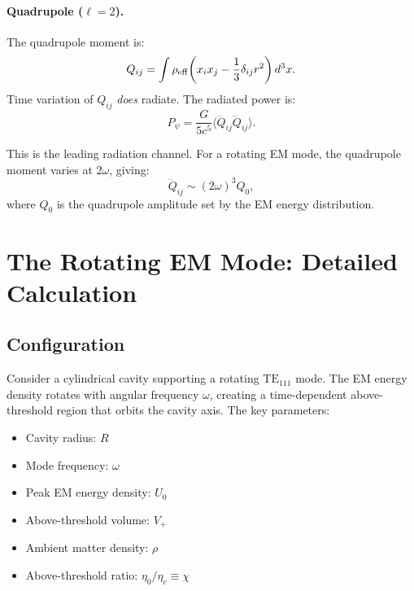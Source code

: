 \documentclass[11pt]{article}
\newcommand{\etac}{\eta_c}
\begin{document}
\paragraph{Quadrupole ($\ell = 2$).}
The quadrupole moment is:
\begin{equation}
Q_{ij} = \int \rho_{\rm eff}\!\left(x_i x_j
- \frac{1}{3}\delta_{ij}r^2\right)d^3x.
\end{equation}
Time variation of $Q_{ij}$ \emph{does} radiate. The radiated power is:
\begin{equation}\label{eq:quadrupole-power}
P_\psi = \frac{G}{5c^5}\langle\dddot{Q}_{ij}\dddot{Q}_{ij}\rangle.
\end{equation}

This is the leading radiation channel. For a rotating EM mode, the
quadrupole moment varies at $2\omega$, giving:
\begin{equation}
\dddot{Q}_{ij} \sim (2\omega)^3 Q_0,
\end{equation}
where $Q_0$ is the quadrupole amplitude set by the EM energy
distribution.

\section{The Rotating EM Mode: Detailed Calculation}\label{sec:rotating}

\subsection{Configuration}

Consider a cylindrical cavity supporting a rotating $\text{TE}_{111}$
mode. The EM energy density rotates with angular frequency $\omega$,
creating a time-dependent above-threshold region that orbits the
cavity axis. The key parameters:
\begin{itemize}
\item Cavity radius: $R$
\item Mode frequency: $\omega$
\item Peak EM energy density: $U_0$
\item Above-threshold volume: $V_+$
\item Ambient matter density: $\rho$
\item Above-threshold ratio: $\eta_0/\etac \equiv \chi$
\end{itemize}
\end{document}

